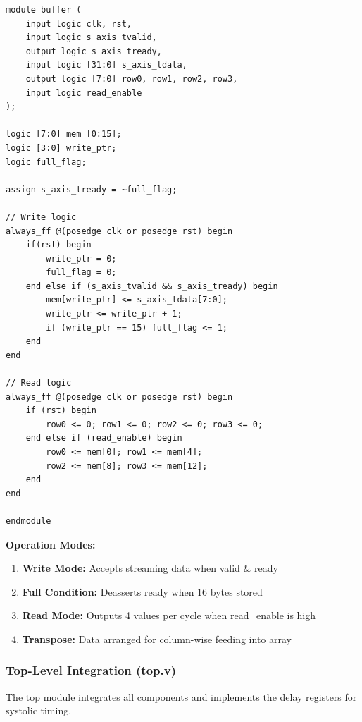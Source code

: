 \documentclass[12pt,a4paper]{article}
\begin{document}
\begin{lstlisting}[style=verilog,caption={AXI-Stream Buffer with Handshaking},label={lst:buffer}]
module buffer (
    input logic clk, rst,
    input logic s_axis_tvalid,
    output logic s_axis_tready,
    input logic [31:0] s_axis_tdata,
    output logic [7:0] row0, row1, row2, row3,
    input logic read_enable
);

logic [7:0] mem [0:15];
logic [3:0] write_ptr;
logic full_flag;

assign s_axis_tready = ~full_flag;

// Write logic
always_ff @(posedge clk or posedge rst) begin
    if(rst) begin
        write_ptr = 0;
        full_flag = 0;
    end else if (s_axis_tvalid && s_axis_tready) begin
        mem[write_ptr] <= s_axis_tdata[7:0];
        write_ptr <= write_ptr + 1;
        if (write_ptr == 15) full_flag <= 1;
    end
end

// Read logic
always_ff @(posedge clk or posedge rst) begin
    if (rst) begin
        row0 <= 0; row1 <= 0; row2 <= 0; row3 <= 0;
    end else if (read_enable) begin
        row0 <= mem[0]; row1 <= mem[4];
        row2 <= mem[8]; row3 <= mem[12];
    end
end

endmodule
\end{lstlisting}

\textbf{Operation Modes:}
\begin{enumerate}
    \item \textbf{Write Mode:} Accepts streaming data when valid \& ready
    \item \textbf{Full Condition:} Deasserts ready when 16 bytes stored
    \item \textbf{Read Mode:} Outputs 4 values per cycle when read\_enable is high
    \item \textbf{Transpose:} Data arranged for column-wise feeding into array
\end{enumerate}

\newpage

\subsubsection{Top-Level Integration (top.v)}

The top module integrates all components and implements the  delay registers for systolic timing.
\end{document}
